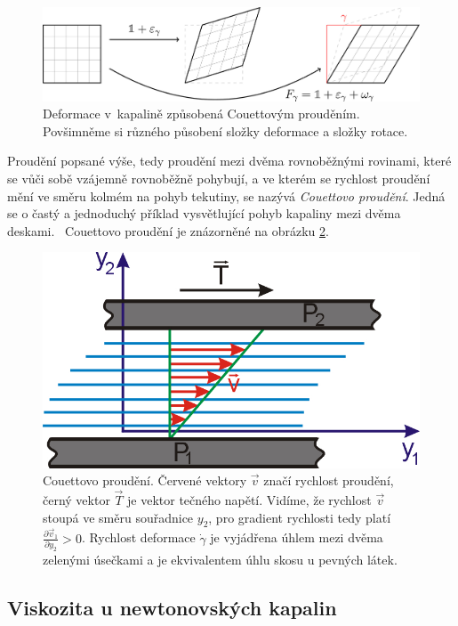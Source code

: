 \documentclass[12pt]{article}
\begin{document}
\begin{figure}
    \centering
    \includegraphics{figures/deformace_couett.jpg}
    \caption{Deformace v~kapalině způsobená Couettovým prouděním. Povšimněme si různého působení složky deformace a složky rotace.~\cite{Figure:Deformace_couett}}
    \label{fig:Deformace_couett}
\end{figure}

Proudění popsané výše, tedy proudění mezi dvěma rovnoběžnými rovinami, které se vůči sobě vzájemně rovnoběžně pohybují, a ve kterém se rychlost proudění mění ve směru kolmém na pohyb tekutiny, se nazývá \emph{Couettovo proudění}. Jedná se o častý a jednoduchý příklad vysvětlující pohyb kapaliny mezi dvěma deskami.~\cite{online:Skripta_rychlost_deformace} Couettovo proudění je znázorněné na obrázku \ref{fig:couett}.

\begin{figure}
    \centering
    \includegraphics[width = 0.5\linewidth]{figures/couette.jpg}
    \caption{Couettovo proudění. Červené vektory $\vec{v}$ značí rychlost proudění, černý vektor $\vec{T}$ je vektor tečného napětí. Vidíme, že rychlost $\vec{v}$ stoupá ve směru souřadnice $y_2$, pro gradient rychlosti tedy platí $\frac{\partial\vec{v}_1}{\partial y_2} > 0$. Rychlost deformace $\dot\gamma$ je vyjádřena úhlem mezi dvěma zelenými úsečkami a je ekvivalentem úhlu skosu u pevných látek.~\cite{Figure:Skripta_couette}}
    \label{fig:couett}
\end{figure}

\subsection{Viskozita u newtonovských kapalin}%
\end{document}
